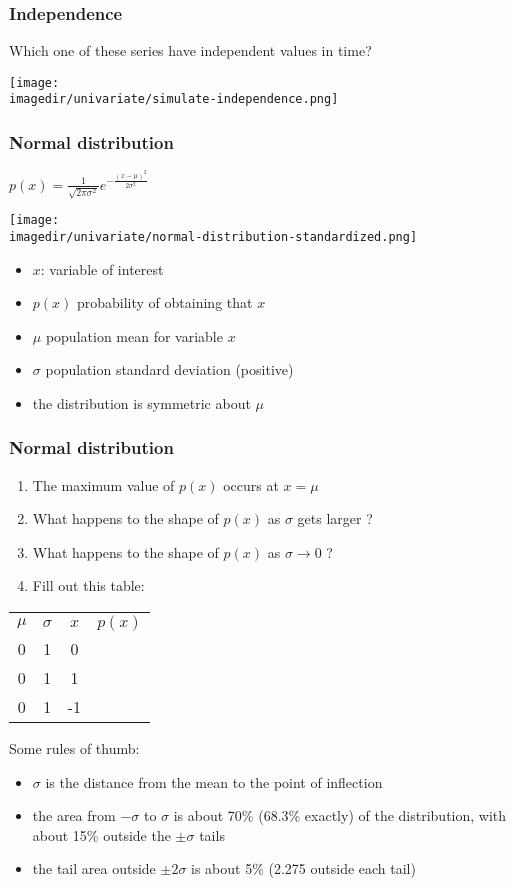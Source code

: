 \begin{frame}\frametitle{Independence}

	Which one of these series have independent values in time?

	\texttt{[image: \\imagedir/univariate/simulate-independence.png]}
\end{frame}

\begin{frame}\frametitle{Normal distribution}

	$ p(x) = \displaystyle \frac{1}{\sqrt{2\pi \sigma^2}}e^{-\frac{\displaystyle (x-\mu)^2}{\displaystyle 2\sigma^2}} $

	\texttt{[image: \\imagedir/univariate/normal-distribution-standardized.png]}
	\begin{itemize}
		\item $x$: variable of interest
		\item $p(x)$ probability of obtaining that $x$
		\item $\mu$ population mean for variable $x$
		\item $\sigma$ population standard deviation (positive)
		\item the distribution is symmetric about $\mu$
	\end{itemize}
\end{frame}

\begin{frame}\frametitle{Normal distribution}
	\begin{enumerate}
		\item The maximum value of $p(x)$ occurs at $x = \mu$
		\item What happens to the shape of $p(x)$ as $\sigma$ gets larger ?
		\item What happens to the shape of $p(x)$ as $\sigma \rightarrow 0$ ?
		\item Fill out this table:
	\end{enumerate}
	\begin{tabular}{cccc}
		$\mu$		&	$\sigma$ 	&	$x$		&	$p(x)$\\
		0 			&  	1			& 	0 		&		  \\
		0 			&	1			& 	1		&  		  \\
		0 			&	1			& 	-1		&  		  
	\end{tabular}
	Some rules of thumb:
	\begin{itemize}
		\item $\sigma$ is the distance from the mean to the point of inflection
		\item the area from $-\sigma$ to $\sigma$ is about 70\% (68.3\% exactly) of the distribution, with about 15\% outside the $\pm \sigma$ tails
		\item the tail area outside $\pm 2\sigma$ is about 5\% (2.275 outside each tail)
	\end{itemize}
\end{frame}

